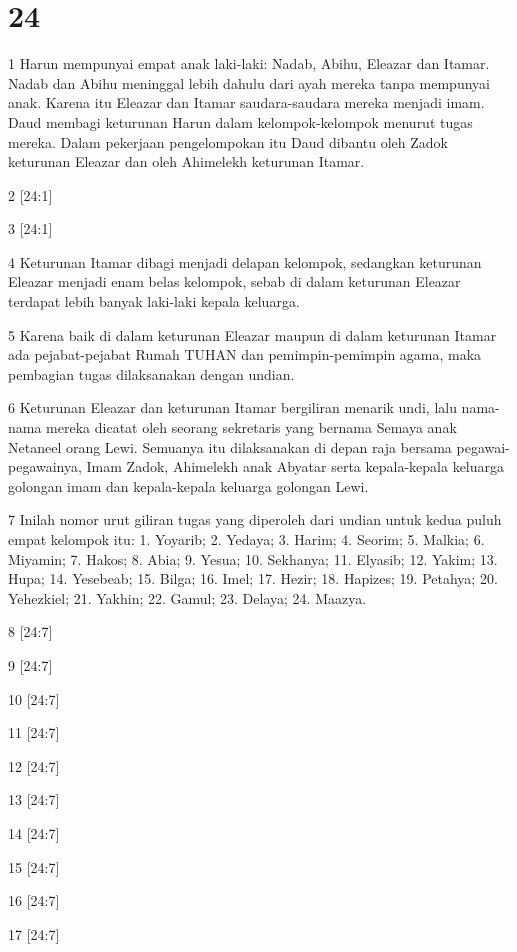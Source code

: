 \chapter{24}

\par 1 Harun mempunyai empat anak laki-laki: Nadab, Abihu, Eleazar dan Itamar. Nadab dan Abihu meninggal lebih dahulu dari ayah mereka tanpa mempunyai anak. Karena itu Eleazar dan Itamar saudara-saudara mereka menjadi imam. Daud membagi keturunan Harun dalam kelompok-kelompok menurut tugas mereka. Dalam pekerjaan pengelompokan itu Daud dibantu oleh Zadok keturunan Eleazar dan oleh Ahimelekh keturunan Itamar.
\par 2 [24:1]
\par 3 [24:1]
\par 4 Keturunan Itamar dibagi menjadi delapan kelompok, sedangkan keturunan Eleazar menjadi enam belas kelompok, sebab di dalam keturunan Eleazar terdapat lebih banyak laki-laki kepala keluarga.
\par 5 Karena baik di dalam keturunan Eleazar maupun di dalam keturunan Itamar ada pejabat-pejabat Rumah TUHAN dan pemimpin-pemimpin agama, maka pembagian tugas dilaksanakan dengan undian.
\par 6 Keturunan Eleazar dan keturunan Itamar bergiliran menarik undi, lalu nama-nama mereka dicatat oleh seorang sekretaris yang bernama Semaya anak Netaneel orang Lewi. Semuanya itu dilaksanakan di depan raja bersama pegawai-pegawainya, Imam Zadok, Ahimelekh anak Abyatar serta kepala-kepala keluarga golongan imam dan kepala-kepala keluarga golongan Lewi.
\par 7 Inilah nomor urut giliran tugas yang diperoleh dari undian untuk kedua puluh empat kelompok itu: 1. Yoyarib; 2. Yedaya; 3. Harim; 4. Seorim; 5. Malkia; 6. Miyamin; 7. Hakos; 8. Abia; 9. Yesua; 10. Sekhanya; 11. Elyasib; 12. Yakim; 13. Hupa; 14. Yesebeab; 15. Bilga; 16. Imel; 17. Hezir; 18. Hapizes; 19. Petahya; 20. Yehezkiel; 21. Yakhin; 22. Gamul; 23. Delaya; 24. Maazya.
\par 8 [24:7]
\par 9 [24:7]
\par 10 [24:7]
\par 11 [24:7]
\par 12 [24:7]
\par 13 [24:7]
\par 14 [24:7]
\par 15 [24:7]
\par 16 [24:7]
\par 17 [24:7]
